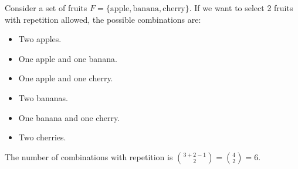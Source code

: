         \begin{example}
            Consider a set of fruits \( F = \{ \text{apple}, \text{banana}, \text{cherry} \} \). If we want to select 2 fruits with repetition allowed, the possible combinations are:
        \begin{itemize}
        \item Two apples.
        \item One apple and one banana.
        \item One apple and one cherry.
        \item Two bananas.
        \item One banana and one cherry.
        \item Two cherries.
        \end{itemize}
        The number of combinations with repetition is \( \binom{3 + 2 - 1}{2} = \binom{4}{2} = 6 \).
        \end{example}

